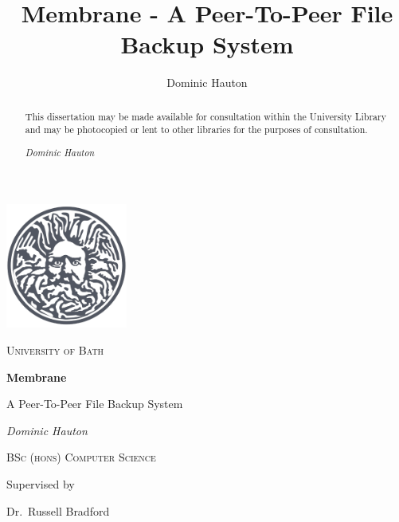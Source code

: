 \documentclass[11pt, a4paper, twoside]{report}
\title{Membrane - A Peer-To-Peer File Backup System}
\author{Dominic Hauton}
\begin{document}
\begin{titlepage}
	\centering
	\includegraphics[width=0.3\textwidth]{uob-logo}\par\vspace{0.5cm}
	{\scshape\LARGE University of Bath \par}
	\vspace{2.5cm}
	{\huge\bfseries Membrane\par A Peer-To-Peer File Backup System\par}
	\vspace{1.5cm}
	{\Large\itshape Dominic Hauton\par}
	\vspace{1cm}
	{\scshape\Large BSc (hons) Computer Science\par}
	\vfill
	Supervised by\par
	Dr.~Russell Bradford

	\vspace{1cm}

	{\large \the\year\par}
\end{titlepage}

\renewcommand{\abstractname}{}
\begin{abstract}
This dissertation may be made available for consultation within the University
Library and may be photocopied or lent to other libraries for the purposes of consultation.

\vspace{0.5cm}
\noindent
\emph{Dominic Hauton}
\end{abstract}
\end{document}
